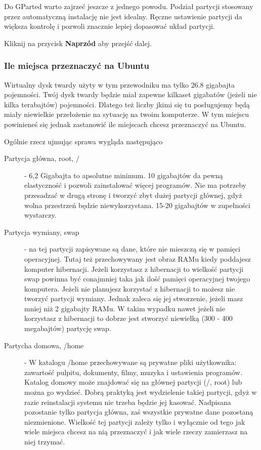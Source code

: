 Do GParted warto zajrzeć jeszcze z jednego powodu. Podział partycji stosowany przez automatyczną instalację nie jest idealny. Ręczne ustawienie partycji da większa kontrolę i pozwoli znacznie lepiej dopasować układ partycji.
\begin{flushright}
Kliknij na przycisk \textbf{Naprzód} aby przejść dalej.
\end{flushright}
\clearpage
\subsubsection{Ile miejsca przeznaczyć na Ubuntu}
\label{subsubsec:ile_miejsca}
Wirtualny dysk twardy użyty w tym przewodniku ma tylko 26.8 gigabajta pojemności. Twój dysk twardy będzie miał zapewne kilkaset gigabatów (jeżeli nie kilka terabajtów) pojemności. Dlatego też liczby jkimi się tu posługujemy będą miały niewielkie przełożenie na sytuację na twoim komputerze. W tym miejscu powinieneś się jednak zastanowić ile miejscach chcesz przeznaczyć na Ubuntu.

Ogólnie rzecz ujmując sprawa wygląda następująco
\begin{description}
\item[Partycja główna, root, /] - 6,2 Gigabajta to apsolutne minimum. 10 gigabajtów da pewną elastyczność i pozwoli zainstalować więcej programów. Nie ma potrzeby przesadzać w drugą stronę i tworzyć zbyt dużej partycji głównej, gdyż wolna przestrzeń będzie niewykorzystana. 15-20 gigabajtów w zupełności wystarczy.
\item[Partycja wymiany, swap] - na tej partycji zapisywane są dane, które nie mieszczą się w pamięci operacyjnej. Tutaj też przechowywany jest obraz RAMu kiedy poddajesz komputer hibernacji. Jeżeli korzystasz z hibernacji to wielkość partycji swap powinna być conajmniej taka jak ilość pamięci operacyjnej twojego komputera. Jeżeli nie planujesz korzystać z hibernacji to możesz nie tworzyć partycji wymiany. Jednak zaleca się jej stworzenie, jeżeli masz mniej niż 2 gigabajty RAMu. W takim wypadku nawet jeżeli nie korzystasz z hibernacji to dobrze jest stworzyć niewielką (300 - 400 megabajtów) partycję swap.
\item[Partycha domowa, /home] - W katalogu /home przechowywane są prywatne pliki użytkownika: zawartość pulpitu, dokumenty, filmy, muzyka i ustawienia programów. Katalog domowy może znajdować się na głównej partycji (/, root) lub można go wydzieć. Dobrą praktyką jest wydzielenie takiej partycji, gdyż w razie reinstalacji systemu nie trzeba będzie jej kasować. Nadpisana pozostanie tylko partycja główna, zaś wszystkie prywatne dane pozostaną niezmienione. Wielkość tej partycji zależy tylko i wyłącznie od tego jak wiele miejsca chcesz na nią przeznaczyć i jak wiele rzeczy zamierzasz na niej trzymać. 
\end{description}
\clearpage
